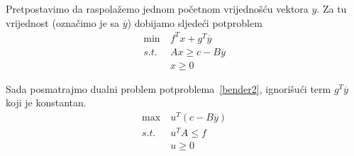 \documentclass[a4paper, utf8, 11pt, colorlinks]{book}
\begin{document}
 Pretpostavimo da raspolažemo jednom početnom vrijednošću vektora $y$. Za tu vrijednost (označimo je sa $\overline{y}$) dobijamo sljedeći potproblem
  \begin{equation}
 	\begin{aligned}\label{bender2}
\min\ &  f^Tx+g^T\overline{y}\\
  s.t.\ & Ax\geqslant c-B\overline{y}\\
 &x\geqslant 0
  \end{aligned}
\end{equation}
 
Sada posmatrajmo dualni problem potproblema~\ref{bender2}, ignorišući term $g^T\overline{y}$ koji je konstantan.
  \begin{equation}
	\begin{aligned}\label{bender3}
	\max\ &u^T (c-B\overline{y})\\
	s.t.\ &u^TA\leqslant f\\
	&u\geqslant 0
  \end{aligned}
\end{equation}
\end{document}
